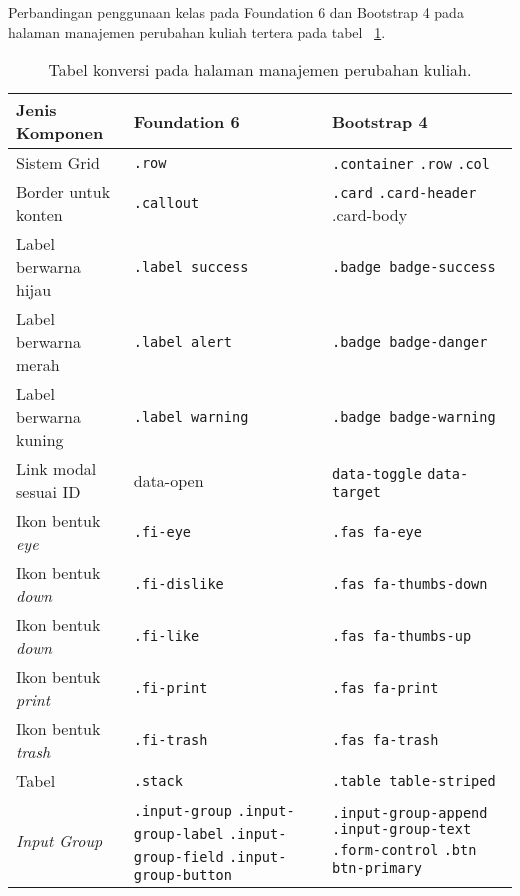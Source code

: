\noindent Perbandingan penggunaan kelas pada Foundation 6 dan Bootstrap 4 pada halaman manajemen perubahan kuliah tertera pada tabel ~\ref{table:konversiManajemenPerubahanKuliah}.\\
\begin{table}[H]
	\caption{Tabel konversi pada halaman manajemen perubahan kuliah.}
	\begin{tabular}{| p{} | p{} | p{} |} 
		\hline
		\textbf{Jenis Komponen} & \textbf{Foundation 6} & \textbf{Bootstrap 4}  \\ [0.5ex] 
		\hline	
		Sistem Grid & \texttt{.row} &   \texttt{.container} \newline \texttt{.row} \newline \texttt{.col} \\ 
		\hline	
		Border untuk konten & \texttt{.callout} &  \texttt{.card} \newline \texttt{.card-header} \newline .card-body \\	
		\hline	
		Label berwarna hijau & \texttt{.label success} &  \texttt{.badge badge-success} \\
		\hline	
		Label berwarna merah &\texttt{.label alert} & \texttt{.badge badge-danger}  \\
		\hline	
		Label berwarna kuning & \texttt{.label warning} & \texttt{.badge badge-warning}  \\
		\hline	
		Link modal sesuai ID & data-open & \texttt{data-toggle} \newline \texttt{data-target} \\
		\hline
		Ikon bentuk \textit{eye} & \texttt{.fi-eye} &  \texttt{.fas fa-eye} \\	
		\hline	
		Ikon bentuk \textit{down} & \texttt{.fi-dislike} &  \texttt{.fas fa-thumbs-down} \\	
		\hline
		Ikon bentuk \textit{down} & \texttt{.fi-like} &  \texttt{.fas fa-thumbs-up} \\	
		\hline
		Ikon bentuk \textit{print} & \texttt{.fi-print} &  \texttt{.fas fa-print} \\	
		\hline
		Ikon bentuk \textit{trash} & \texttt{.fi-trash} &  \texttt{.fas fa-trash} \\	
		\hline
		Tabel & \texttt{.stack} & \texttt{.table table-striped}  \\
		\hline	
		\textit{Input Group} & \texttt{.input-group} \newline \texttt{.input-group-label} \newline \texttt{.input-group-field} \newline \texttt{.input-group-button} & \texttt{.input-group-append} \newline \texttt{.input-group-text} \newline \texttt{.form-control} \newline \texttt{.btn btn-primary} \\[1ex]
		\hline	
	\end{tabular}
	\label{table:konversiManajemenPerubahanKuliah}
\end{table}



